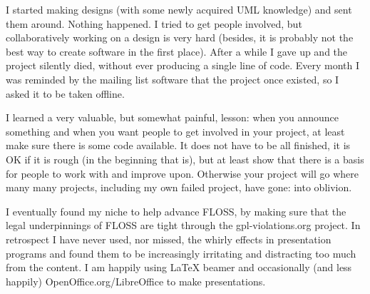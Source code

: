I started making designs (with some newly acquired UML knowledge) and sent them
around. Nothing happened. I tried to get people involved, but collaboratively
working on a design is very hard (besides, it is probably not the best way to
create software in the first place). After a while I gave up and the project
silently died, without ever producing a single line of code. Every month I was
reminded by the mailing list software that the project once existed, so I asked
it to be taken offline.

I learned a very valuable, but somewhat painful, lesson: when you announce
something and when you want people to get involved in your project, at least
make sure there is some code available. It does not have to be all finished, it
is OK if it is rough (in the beginning that is), but at least show that there is
a basis for people to work with and improve upon. Otherwise your project will go
where many many projects, including my own failed project, have gone: into
oblivion.

I eventually found my niche to help advance FLOSS, by making sure that the legal
underpinnings of FLOSS are tight through the gpl-violations.org project. In
retrospect I have never used, nor missed, the whirly effects in presentation
programs and found them to be increasingly irritating and distracting too much
from the content. I am happily using LaTeX beamer and occasionally (and less
happily) OpenOffice.org/LibreOffice to make presentations.
